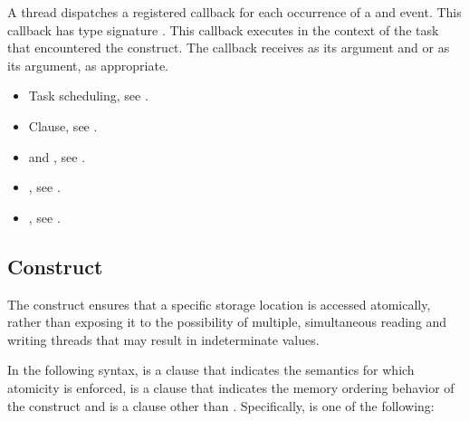 A thread dispatches a registered
 callback
for each occurrence of a  and  event.
This callback has type signature .
This callback executes in the context of the task that encountered the
 construct. The callback receives
 as its  argument and
 or 
as its  argument, as appropriate.

\crossreferences
\begin{itemize}
\item Task scheduling, see
.
\item {} Clause, see .

\item {} and , see
.

\item {}, see
.

\item {}, see
.

\end{itemize}










\subsection{ Construct}
\label{subsec:atomic Construct}
\summary
The  construct ensures that a specific storage location is accessed atomically,
rather than exposing it to the possibility of multiple, simultaneous reading and writing
threads that may result in indeterminate values.

\syntax
In the following syntax,  is a clause that indicates
the semantics for which atomicity is enforced,  is
a clause that indicates the memory ordering behavior of the construct and
 is a clause other than .
Specifically,  is one of the following:


